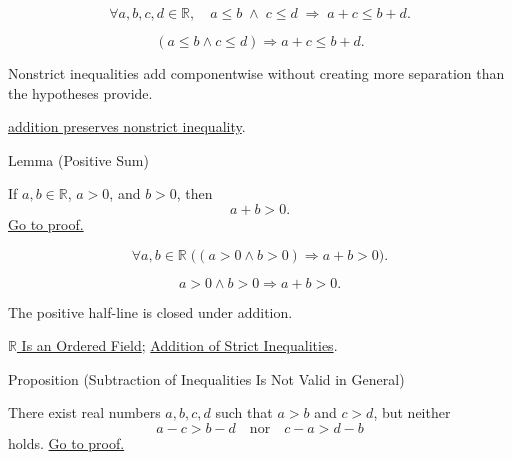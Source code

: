\begin{remark*}
\[
  \forall a, b, c, d \in \mathbb{R},\quad
  a \le b \;\land\; c \le d \;\Rightarrow\; a + c \le b + d.
\]
\end{remark*}

\begin{remark*}
\[
(a\le b\land c\le d)\Rightarrow a+c\le b+d.
\]
\end{remark*}

\begin{remark*}[Interpretation]
Nonstrict inequalities add componentwise without creating more separation than the hypotheses provide.
\end{remark*}

\begin{dependencies}
\hyperref[thm:ineq-nonstrict-add-both-sides]{addition preserves nonstrict inequality}.
\end{dependencies}

\begin{lemmabox}{Lemma (Positive Sum)}
\begin{lemma}
\label{lem:positive-sum}
If $a,b\in\mathbb{R}$, $a>0$, and $b>0$, then
\[
a+b>0.
\]
\hyperref[prf:positive-sum]{Go to proof.}
\end{lemma}
\end{lemmabox}

\begin{remark*}
\[
\forall a,b\in\mathbb{R}\;\bigl((a>0\land b>0)\Rightarrow a+b>0\bigr).
\]
\end{remark*}

\begin{remark*}
\[
a>0\land b>0\Rightarrow a+b>0.
\]
\end{remark*}

\begin{remark*}[Interpretation]
The positive half-line is closed under addition.
\end{remark*}

\begin{dependencies}
\hyperref[thm:r-is-an-ordered-field]{$\mathbb{R}$ Is an Ordered Field};
\hyperref[thm:ineq-add-inequalities]{Addition of Strict Inequalities}.
\end{dependencies}

\begin{propositionbox}{Proposition (Subtraction of Inequalities Is Not Valid in General)}
\begin{proposition}
\label{prop:subtraction-of-inequalities-not-valid}
There exist real numbers $a,b,c,d$ such that $a>b$ and $c>d$, but neither
\[
a-c>b-d
\quad\text{nor}\quad
c-a>d-b
\]
holds.
\hyperref[prf:subtraction-of-inequalities-not-valid]{Go to proof.}
\end{proposition}
\end{propositionbox}

